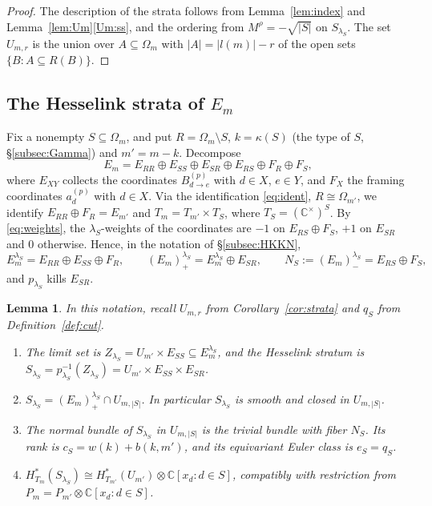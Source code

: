 \documentclass[11pt]{amsart}
\newtheorem{lemma}[theorem]{Lemma}
\theoremstyle{definition}
\theoremstyle{remark}
\numberwithin{equation}{section}
\newcommand{\C}{\mathbb{C}}
\newcommand{\Om}{\Omega_m}
\newcommand{\Lp}{(E_m)^{\lambda_S}_{+}}
\begin{document}
\begin{proof}
The description of the strata follows from Lemma~\ref{lem:index} and Lemma~\ref{lem:Um}\ref{Um:ss}, and
the ordering from $M^\rho=-\sqrt{|S|}$ on $S_{\lambda_S}$. The set $U_{m,r}$ is the union over
$A\subseteq\Om$ with $|A|=|l(m)|-r$ of the open sets $\{B: A\subseteq R(B)\}$.
\end{proof}

\subsection{The Hesselink strata of \texorpdfstring{$E_m$}{E\_m}}\label{subsec:strata}
Fix a nonempty $S\subseteq\Om$, and put $R=\Om\setminus S$, $k=\kappa(S)$ (the type of $S$,
\S\ref{subsec:Gamma}) and $m'=m-k$. Decompose
\[
  E_m=E_{RR}\oplus E_{SS}\oplus E_{SR}\oplus E_{RS}\oplus F_R\oplus F_S,
\]
where $E_{XY}$ collects the coordinates $B^{(p)}_{d\to e}$ with $d\in X$, $e\in Y$, and $F_X$ the framing
coordinates $a^{(p)}_d$ with $d\in X$. Via the identification \eqref{eq:ident}, $R\cong\Omega_{m'}$, we
identify $E_{RR}\oplus F_R=E_{m'}$ and $T_m=T_{m'}\times T_S$, where $T_S=(\C^\times)^S$. By
\eqref{eq:weights}, the $\lambda_S$-weights of the coordinates are $-1$ on $E_{RS}\oplus F_S$, $+1$ on
$E_{SR}$ and $0$ otherwise. Hence, in the notation of \S\ref{subsec:HKKN},
\begin{equation}\label{eq:EmlambdaS}
  E_m^{\lambda_S}=E_{RR}\oplus E_{SS}\oplus F_R,\qquad
  \Lp=E_m^{\lambda_S}\oplus E_{SR},\qquad
  N_S:=(E_m)^{\lambda_S}_-=E_{RS}\oplus F_S,
\end{equation}
and $p_{\lambda_S}$ kills $E_{SR}$.

\begin{lemma}\label{lem:strata}
In this notation, recall $U_{m,r}$ from Corollary~\ref{cor:strata} and $q_S$ from
Definition~\ref{def:cut}.
\begin{enumerate}[label=(\alph*),leftmargin=2em]
\item\label{st:Z} The limit set is $Z_{\lambda_S}=U_{m'}\times E_{SS}\subseteq E_m^{\lambda_S}$, and the
Hesselink stratum is $S_{\lambda_S}=p_{\lambda_S}^{-1}(Z_{\lambda_S})=U_{m'}\times E_{SS}\times E_{SR}$.
\item\label{st:closed} $S_{\lambda_S}=\Lp\cap U_{m,|S|}$. In particular $S_{\lambda_S}$ is smooth and
closed in $U_{m,|S|}$.
\item\label{st:normal} The normal bundle of $S_{\lambda_S}$ in $U_{m,|S|}$ is the trivial bundle with
fiber $N_S$. Its rank is $c_S=w(k)+b(k,m')$, and its equivariant Euler class is $e_S=q_S$.
\item\label{st:coh} $H^*_{T_m}(S_{\lambda_S})\cong H^*_{T_{m'}}(U_{m'})\otimes\C[x_d:d\in S]$, compatibly
with restriction from $P_m=P_{m'}\otimes\C[x_d:d\in S]$.
\end{enumerate}
\end{lemma}
\end{document}
